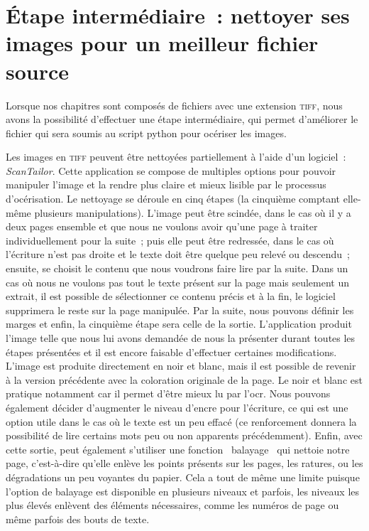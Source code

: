 \section{Étape intermédiaire~: nettoyer ses images pour un meilleur fichier source}
Lorsque nos chapitres sont composés de fichiers avec une extension \textsc{tiff}, nous avons la possibilité d'effectuer une étape intermédiaire, qui permet d'améliorer le fichier qui sera soumis au script python pour océriser les images.

Les images en \textsc{tiff} peuvent être nettoyées partiellement à l'aide d'un logiciel~: \emph{ScanTailor}. Cette application se compose de multiples options pour pouvoir manipuler l'image et la rendre plus claire et mieux lisible par le processus d'océrisation. Le nettoyage se déroule en cinq étapes (la cinquième comptant elle-même plusieurs manipulations). L'image peut être scindée, dans le cas où il y a deux pages ensemble et que nous ne voulons avoir qu'une page à traiter individuellement pour la suite~; puis elle peut être redressée, dans le cas où l'écriture n'est pas droite et le texte doit être quelque peu relevé ou descendu~; ensuite, se choisit le contenu que nous voudrons faire lire par la suite. Dans un cas où nous ne voulons pas tout le texte présent sur la page mais seulement un extrait, il est possible de sélectionner ce contenu précis et à la fin, le logiciel supprimera le reste sur la page manipulée. Par la suite, nous pouvons définir les marges et enfin, la cinquième étape sera celle de la sortie. L'application produit l'image telle que nous lui avons demandée de nous la présenter durant toutes les étapes présentées et il est encore faisable d'effectuer certaines modifications. L'image est produite directement en noir et blanc, mais il est possible de revenir à la version précédente avec la coloration originale de la page. Le noir et blanc est pratique notamment car il permet d'être mieux lu par l'\acrshort{ocr}. Nous pouvons également décider d'augmenter le niveau d'encre pour l'écriture, ce qui est une option utile dans le cas où le texte est un peu effacé (ce renforcement donnera la possibilité de lire certains mots peu ou non apparents précédemment). Enfin, avec cette sortie, peut également s'utiliser une fonction \og~balayage~\fg{} qui nettoie notre page, c'est-à-dire qu'elle enlève les points présents sur les pages, les ratures, ou les dégradations un peu voyantes du papier. Cela a tout de même une limite puisque l'option de balayage est disponible en plusieurs niveaux et parfois, les niveaux les plus élevés enlèvent des éléments nécessaires, comme les numéros de page ou même parfois des bouts de texte.

